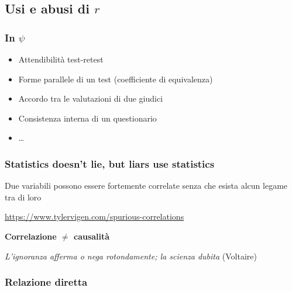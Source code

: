 \documentclass[
  a4paper,
  DIV=11,
  numbers=noendperiod]{scrreprt}
\begin{document}
\subsection{\texorpdfstring{Usi e abusi di
\(r\)}{Usi e abusi di r}}\label{usi-e-abusi-di-r}

\subsubsection{\texorpdfstring{In
\(\psi\)}{In \textbackslash psi}}\label{in-psi}

\begin{itemize}
\item
  Attendibilità test-retest
\item
  Forme parallele di un test (coefficiente di equivalenza)
\item
  Accordo tra le valutazioni di due giudici
\item
  Consistenza interna di un questionario
\item
  \ldots{}
\end{itemize}

\subsubsection{Statistics doesn't lie, but liars use
statistics}\label{statistics-doesnt-lie-but-liars-use-statistics}

Due variabili possono essere fortemente correlate senza che esista alcun
legame tra di loro

\vspace{3mm}

\begin{center}
\url{https://www.tylervigen.com/spurious-correlations}
\end{center}

\vspace{3mm}

\begin{center}
\textbf{Correlazione $\neq$ causalità}
\end{center}

\vspace{2mm}

\begin{center}
\textit{L'ignoranza afferma o nega rotondamente; la scienza dubita} (Voltaire)
\end{center}

\subsubsection{Relazione diretta}\label{relazione-diretta}
\end{document}
